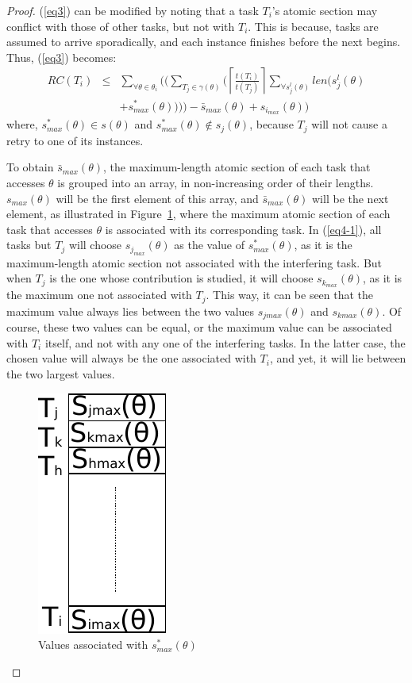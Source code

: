 \documentclass{sig-alternate}
\begin{document}
\begin{proof}
(\ref{eq3}) can be modified by noting that a task $T_i$'s atomic section 
may conflict with those of other tasks, but not with $T_i$. 
This is because, tasks are assumed to arrive sporadically, and  each instance finishes before the next begins. 
Thus, (\ref{eq3}) becomes:
\begin{eqnarray}
RC(T_{i}) & \le & \sum_{\forall\theta\in\theta_{i}} \Big( \Big(\sum_{T_{j}\in\gamma(\theta)} \Big(\left\lceil\frac{t\left(T_{i}\right)}{t\left(T_{j}\right)}\right\rceil\sum_{\forall s_{j}^{l}(\theta)}len \big(s_{j}^{l}(\theta)\nonumber \\
 &  & +s_{max}^{*}(\theta) \big) \Big) \Big)-\bar{s}_{max}(\theta)+s_{i_{max}}(\theta) \Big)\label{eq4-1}\end{eqnarray}
where, $s_{max}^{*}(\theta)\in s(\theta)$ and $s_{max}^{*}(\theta)\not\in s_{j}(\theta)$, 
because $T_{j}$ will not cause a retry to one of its instances.


To obtain $\bar{s}{}_{max}(\theta)$, the maximum-length atomic section of each task that accesses $\theta$ is grouped into an array, in non-increasing order of their lengths. $s_{max}(\theta)$ will be the first element of this array, and $\bar{s}_{max}(\theta)$ will be the next element, as illustrated in Figure~\ref{fig7}, where the maximum atomic
section of each task that accesses $\theta$ is associated with
its corresponding task. In (\ref{eq4-1}), all tasks
but $T_{j}$ will choose $s_{j_{max}}(\theta)$ as the value of $s_{max}^{*}(\theta)$,
as it is the maximum-length atomic section not associated with the interfering task. 
But when $T_{j}$ is the one whose contribution is studied,
it will choose $s_{k_{max}}(\theta)$, as it is the maximum one not
associated with $T_{j}$. This way, it can be seen that the maximum
value always lies between the two values $s_{jmax}(\theta)$ and $s_{kmax}(\theta)$. 
Of course, these two values can be equal, or the maximum value can be associated with $T_i$ itself, and not with any one of the interfering tasks. In the latter case,
the chosen value will always be the one associated with $T_i$, and yet, it will lie between the two largest values. 

\begin{figure}[htbp]
\centering
\includegraphics[scale=0.7]{figures/figure7}
\caption{\label{fig7}Values associated with $s_{max}^{*}(\theta)$}
\end{figure}



\end{proof}
\end{document}
